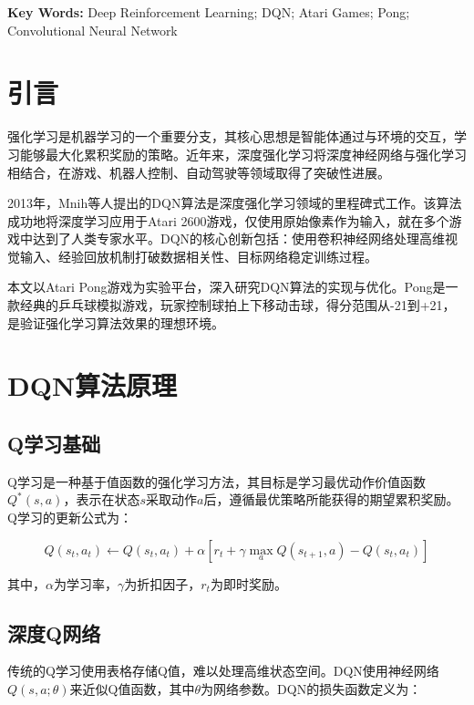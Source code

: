 \documentclass[12pt,a4paper]{article}
\begin{document}
\vspace{0.5cm}

\noindent\textbf{Key Words:} Deep Reinforcement Learning; DQN; Atari Games; Pong; Convolutional Neural Network

\newpage

\section{引言}

强化学习是机器学习的一个重要分支，其核心思想是智能体通过与环境的交互，学习能够最大化累积奖励的策略。近年来，深度强化学习将深度神经网络与强化学习相结合，在游戏、机器人控制、自动驾驶等领域取得了突破性进展。

2013年，Mnih等人提出的DQN算法是深度强化学习领域的里程碑式工作。该算法成功地将深度学习应用于Atari 2600游戏，仅使用原始像素作为输入，就在多个游戏中达到了人类专家水平。DQN的核心创新包括：使用卷积神经网络处理高维视觉输入、经验回放机制打破数据相关性、目标网络稳定训练过程。

本文以Atari Pong游戏为实验平台，深入研究DQN算法的实现与优化。Pong是一款经典的乒乓球模拟游戏，玩家控制球拍上下移动击球，得分范围从-21到+21，是验证强化学习算法效果的理想环境。

\section{DQN算法原理}

\subsection{Q学习基础}

Q学习是一种基于值函数的强化学习方法，其目标是学习最优动作价值函数$Q^*(s,a)$，表示在状态$s$采取动作$a$后，遵循最优策略所能获得的期望累积奖励。Q学习的更新公式为：

\begin{equation}
Q(s_t, a_t) \leftarrow Q(s_t, a_t) + \alpha \left[ r_t + \gamma \max_a Q(s_{t+1}, a) - Q(s_t, a_t) \right]
\end{equation}

其中，$\alpha$为学习率，$\gamma$为折扣因子，$r_t$为即时奖励。

\subsection{深度Q网络}

传统的Q学习使用表格存储Q值，难以处理高维状态空间。DQN使用神经网络$Q(s,a;\theta)$来近似Q值函数，其中$\theta$为网络参数。DQN的损失函数定义为：
\end{document}

